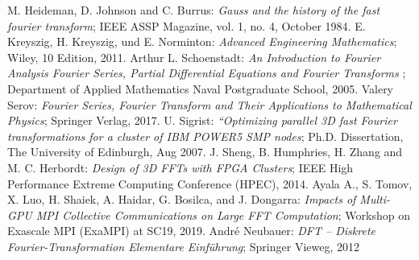  M. Heideman, D. Johnson and C. Burrus: {\sl Gauss and the history of the fast fourier transform}; IEEE ASSP Magazine, vol. 1, no. 4, October 1984.
 E. Kreyszig, H. Kreyszig, und E. Norminton: {\sl Advanced Engineering Mathematics}; Wiley, 10 Edition, 2011.
 Arthur L. Schoenstadt: {\sl An Introduction to Fourier Analysis Fourier Series, Partial Differential Equations
and Fourier Transforms
}; Department of Applied Mathematics Naval Postgraduate School, 2005.
 Valery Serov: {\sl Fourier Series, Fourier Transform and Their Applications to Mathematical Physics}; Springer Verlag, 2017.
 U. Sigrist: {\sl “Optimizing parallel 3D fast Fourier transformations for a
cluster of IBM POWER5 SMP nodes}; Ph.D. Dissertation, The University of Edinburgh, Aug 2007.
J. Sheng, B. Humphries, H. Zhang and M. C. Herbordt: {\sl Design of 3D FFTs with FPGA Clusters}; IEEE High Performance Extreme Computing Conference (HPEC), 2014.
 Ayala A., S. Tomov, X. Luo, H. Shaiek, A. Haidar, G. Bosilca, and J. Dongarra: {\sl Impacts of Multi-GPU MPI Collective Communications on Large FFT Computation}; Workshop on Exascale MPI (ExaMPI) at SC19, 2019.
André Neubauer: {\sl DFT – Diskrete Fourier-Transformation Elementare Einführung}; Springer Vieweg, 2012
